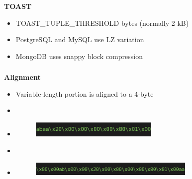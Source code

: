 \documentclass[usenames,dvipsnames, 18pt, compress, aspectratio=169]{beamer}
\begin{document}
\fontsize{14pt}{16}\selectfont
\begin{frame}
    \frametitle{}
    \begin{center}
    \textbf{TOAST}
    \vspace{20pt}


    \vspace{20pt}
    \begin{itemize}[label={\MVRightarrow}]
        \item TOAST\_TUPLE\_THRESHOLD bytes (normally 2 kB)
        \item PostgreSQL and MySQL use LZ variation
        \item MongoDB uses snappy block compression
    \end{itemize}

    \end{center}
\end{frame}

\begin{frame}
    \frametitle{}
    \begin{center}
    \textbf{Alignment}

    \begin{itemize}[label={}]
        \item Variable-length portion is aligned to a 4-byte
        \item \inputminted[fontsize=\Large]{sql}{sql/insert_align1.sql}
        \item \begin{figure}
            \includegraphics[width=0.58\textwidth,left]{align_short.png}
        \end{figure}

        \item \inputminted[fontsize=\Large]{sql}{sql/insert_align2.sql}
        \item \begin{figure}
            \includegraphics[width=0.75\textwidth,left]{align_long.png}
        \end{figure}

    \end{itemize}

    \end{center}
\end{frame}
\end{document}
